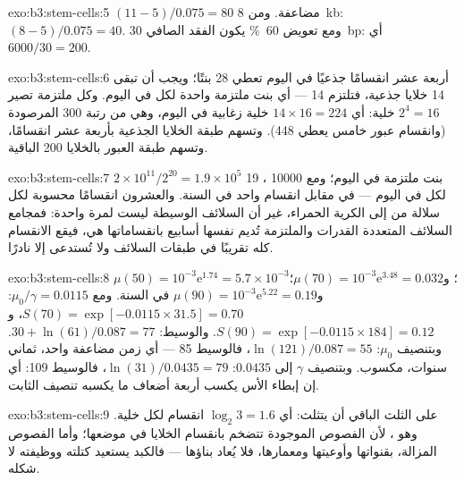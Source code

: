 \begin{solution}{exo:b3:stem-cells:5}
$(11 - 5)/0.075 = 80$ مضاعفة. ومن \qty{8}{kb}: $(8 - 5)/0.075 = 40$.
ومع تعويض \qty{60}{\%} يكون الفقد الصافي \qty{30}{bp}: أي $6000/30
= 200$.
\end{solution}

\begin{solution}{exo:b3:stem-cells:6}
أربعة عشر انقسامًا جذعيًا في اليوم تعطي 28 بنتًا؛ ويجب أن
تبقى 14 خلايا جذعية، فتلتزم 14 --- أي بنت ملتزمة واحدة لكل
 في اليوم. وكل ملتزمة تصير $2^{4} = 16$ خلية: أي
$14\times 16 = 224$ خلية زغابية في اليوم، وهي من رتبة
\num{300} المرصودة (وانقسام عبور خامس يعطي \num{448}). وتسهم
طبقة الخلايا الجذعية بأربعة عشر انقسامًا، وتسهم طبقة العبور
بالخلايا \num{200} الباقية.
\end{solution}

\begin{solution}{exo:b3:stem-cells:7}
$2\times 10^{11}/2^{20} = 1.9\times 10^{5}$ بنت ملتزمة في اليوم؛
ومع \num{10000} ، 19 لكل  في اليوم --- في
مقابل انقسام واحد في السنة. والعشرون انقسامًا محسوبة لكل
سلالة من  إلى الكرية الحمراء، غير أن السلائف
الوسيطة ليست لمرة واحدة: فمجامع السلائف المتعددة القدرات
والملتزمة تُديم نفسها أسابيع بانقساماتها هي، فيقع الانقسام
كله تقريبًا في طبقات السلائف ولا تُستدعى  إلا
نادرًا.
\end{solution}

\begin{solution}{exo:b3:stem-cells:8}
$\mu(50) = 10^{-3}\mathrm{e}^{1.74} = 5.7\times 10^{-3}$؛ و$\mu(70) =
10^{-3}\mathrm{e}^{3.48} = 0.032$؛ و$\mu(90) = 10^{-3}\mathrm{e}^{5.22} =
0.19$ في السنة. ومع $\mu_{0}/\gamma = 0.0115$: $S(70) = \exp[-0.0115
\times 31.5] = 0.70$، و$S(90) = \exp[-0.0115\times 184] = 0.12$. والوسيط:
$30 + \ln(61)/0.087 = 77$. وبتنصيف $\mu_{0}$: $\ln(121)/0.087 = 55$،
فالوسيط 85 --- أي زمن مضاعفة واحد، ثماني سنوات، مكسوب. وبتنصيف $\gamma$
إلى $0.0435$: $\ln(31)/0.0435 = 79$، فالوسيط 109: أي إن إبطاء الأس
يكسب أربعة أضعاف ما يكسبه تنصيف الثابت.
\end{solution}

\begin{solution}{exo:b3:stem-cells:9}
على الثلث الباقي أن يتثلث: أي $\log_{2}3 = 1.6$ انقسام لكل خلية.
وهو ، لأن الفصوص الموجودة تتضخم بانقسام الخلايا في
موضعها؛ وأما الفصوص المزالة، بقنواتها وأوعيتها ومعمارها،
فلا يُعاد بناؤها --- فالكبد يستعيد كتلته ووظيفته لا شكله.
\end{solution}

